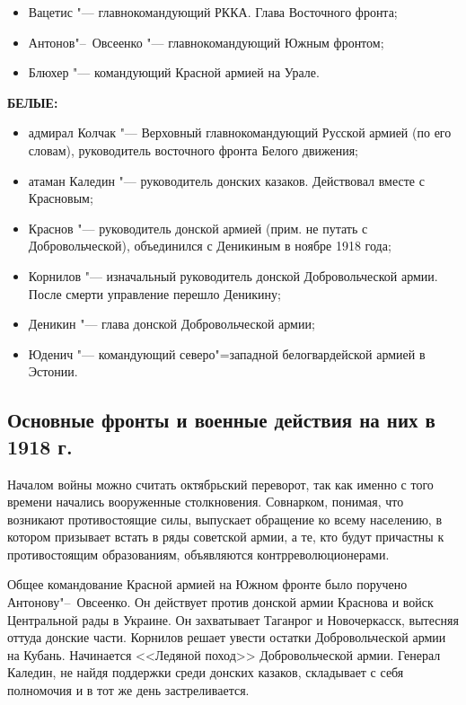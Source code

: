 \begin{itemize}
	\item Вацетис "--- главнокомандующий РККА. Глава Восточного фронта;
	\item Антонов"--~Овсеенко "--- главнокомандующий Южным фронтом;
	\item Блюхер "--- командующий Красной армией на Урале.
\end{itemize}

\textbf{БЕЛЫЕ:}

\begin{itemize}
	\item адмирал Колчак "--- Верховный главнокомандующий Русской армией (по его словам), руководитель восточного фронта Белого движения;
	\item атаман Каледин "--- руководитель донских казаков. Действовал вместе с Красновым;
	\item Краснов "--- руководитель донской армией (прим. не путать с Добровольческой), объединился с Деникиным в ноябре 1918 года;
	\item Корнилов "--- изначальный руководитель донской Добровольческой армии. После смерти управление перешло Деникину;
	\item Деникин "--- глава донской Добровольческой армии;
	\item Юденич "--- командующий северо"=западной белогвардейской армией в Эстонии.
\end{itemize}

\subsection{Основные фронты и военные действия на них в 1918 г.}

Началом войны можно считать октябрьский переворот, так как именно с того времени начались вооруженные столкновения. Совнарком, понимая, что возникают противостоящие силы, выпускает обращение ко всему населению, в котором призывает встать в ряды советской армии, а те, кто будут причастны к противостоящим образованиям, объявляются контрреволюционерами.

Общее командование Красной армией на Южном фронте было поручено Антонову"--~Овсеенко. Он действует против донской армии Краснова и войск Центральной рады в Украине. Он захватывает Таганрог и Новочеркасск, вытесняя оттуда донские части. Корнилов решает увести остатки Добровольческой армии на Кубань. Начинается <<Ледяной поход>> Добровольческой армии. Генерал Каледин, не найдя поддержки среди донских казаков, складывает с себя полномочия и в тот же день застреливается.


